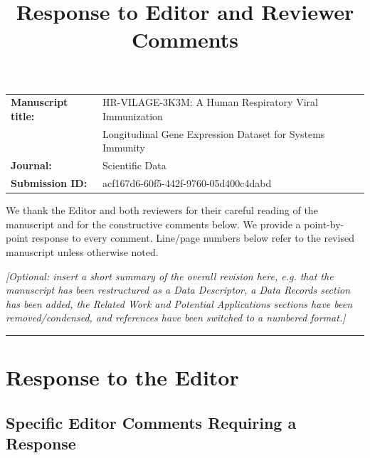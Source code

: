 \documentclass[11pt]{article}
\title{Response to Editor and Reviewer Comments}
\author{}
\date{}
\begin{document}
\maketitle
\vspace{-2.5cm}

\begin{center}
\begin{tabular}{ll}
\textbf{Manuscript title:} & HR-VILAGE-3K3M: A Human Respiratory Viral Immunization \\
 & Longitudinal Gene Expression Dataset for Systems Immunity \\[4pt]
\textbf{Journal:} & Scientific Data \\
\textbf{Submission ID:} & acf167d6-60f5-442f-9760-05d400c4dabd \\
\end{tabular}
\end{center}

\bigskip
\noindent We thank the Editor and both reviewers for their careful reading of the manuscript and
for the constructive comments below. We provide a point-by-point response to every comment.
Line/page numbers below refer to the revised manuscript unless otherwise noted.

\bigskip
\noindent \textit{[Optional: insert a short summary of the overall revision here, e.g. that the
manuscript has been restructured as a Data Descriptor, a Data Records section has been added,
the Related Work and Potential Applications sections have been removed/condensed, and references
have been switched to a numbered format.]}

\vspace{1cm}
\hrule
\vspace{1cm}

\section*{Response to the Editor}

\subsection*{Specific Editor Comments Requiring a Response}
\end{document}
